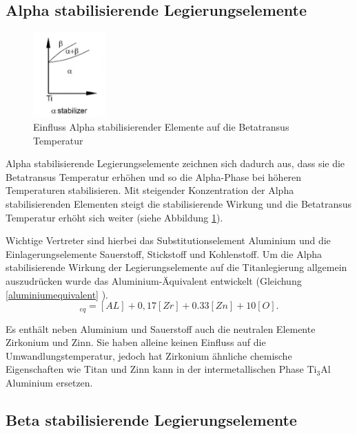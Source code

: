 \documentclass[a4paper, 11pt]{tubsreprt}
\begin{document}
\subsection{Alpha stabilisierende Legierungselemente}
\begin{figure}


\includegraphics[width=0.25\textwidth]{Bilder/alphastabilisierendelegierungselemente.png}

\caption[Einfluss Alpha stabilisierender Elemente auf die Betatransus Temperatur]{Einfluss Alpha stabilisierender Elemente auf die Betatransus Temperatur \cite{Luetjering2007}}
\label{Alpha stabilisierende Legierungselemente}
\end{figure}
Alpha stabilisierende Legierungselemente zeichnen sich dadurch aus, dass sie die Betatransus Temperatur erhöhen und so die Alpha-Phase bei höheren Temperaturen stabilisieren. Mit steigender Konzentration der Alpha stabilisierenden Elementen steigt die stabilisierende Wirkung und die Betatransus Temperatur erhöht sich weiter (siehe Abbildung \ref{Alpha stabilisierende Legierungselemente}).

Wichtige Vertreter sind hierbei das Substitutionselement Aluminium und die Einlagerungselemente Sauerstoff, Stickstoff und Kohlenstoff.
Um die Alpha stabilisierende Wirkung der Legierungselemente auf die Titanlegierung allgemein auszudrücken wurde das Aluminium-Äquivalent entwickelt (Gleichung \ref{aluminiumequivalent} \cite{Luetjering2007}).
\begin{equation}
[AL]_{eq}=[AL]+0,17[Zr]+0.33[Zn]+10[O].
\label{aluminiumequivalent}
\end{equation}

Es enthält neben Aluminium und Sauerstoff auch die neutralen Elemente Zirkonium und Zinn. Sie haben alleine keinen Einfluss auf die Umwandlungstemperatur, jedoch hat Zirkonium ähnliche chemische Eigenschaften wie Titan und Zinn kann in der intermetallischen Phase Ti$_{3}$Al Aluminium ersetzen.

\subsection{Beta stabilisierende Legierungselemente}\label{Kapitel Betastabilisierende Legierungselemente}
\end{document}
